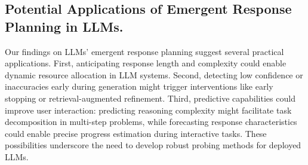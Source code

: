 \subsection{Potential Applications of Emergent Response Planning in LLMs.}
Our findings on LLMs' emergent response planning suggest several practical applications. 
First, anticipating response length and complexity could enable dynamic resource allocation in LLM systems. Second, detecting low confidence or inaccuracies early during generation might trigger interventions like early stopping or retrieval-augmented refinement. Third, predictive capabilities could improve user interaction: predicting reasoning complexity might facilitate task decomposition in multi-step problems, while forecasting response characteristics could enable precise progress estimation during interactive tasks. These possibilities underscore the need to develop robust probing methods for deployed LLMs.




